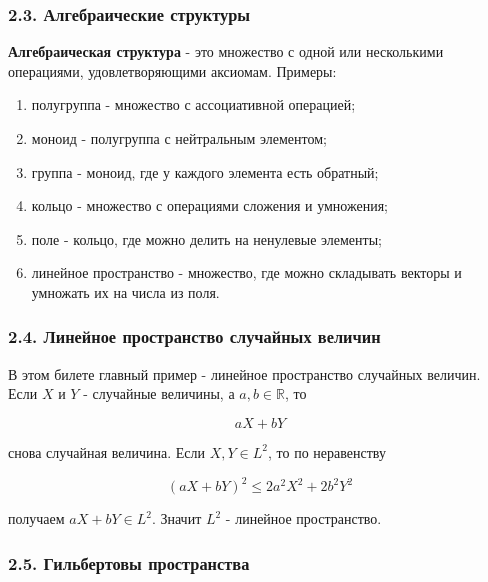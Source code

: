 \documentclass[
  11pt,
  a4paper,
]{article}
\providecommand{\tightlist}{%
  \setlength{\itemsep}{0pt}\setlength{\parskip}{0pt}}
\begin{document}
\subsubsection{2.3. Алгебраические
структуры}\label{ux430ux43bux433ux435ux431ux440ux430ux438ux447ux435ux441ux43aux438ux435-ux441ux442ux440ux443ux43aux442ux443ux440ux44b}

\textbf{Алгебраическая структура} - это множество с одной или
несколькими операциями, удовлетворяющими аксиомам. Примеры:

\begin{enumerate}
\def\labelenumi{\arabic{enumi}.}
\tightlist
\item
  полугруппа - множество с ассоциативной операцией;
\item
  моноид - полугруппа с нейтральным элементом;
\item
  группа - моноид, где у каждого элемента есть обратный;
\item
  кольцо - множество с операциями сложения и умножения;
\item
  поле - кольцо, где можно делить на ненулевые элементы;
\item
  линейное пространство - множество, где можно складывать векторы и
  умножать их на числа из поля.
\end{enumerate}

\subsubsection{2.4. Линейное пространство случайных
величин}\label{ux43bux438ux43dux435ux439ux43dux43eux435-ux43fux440ux43eux441ux442ux440ux430ux43dux441ux442ux432ux43e-ux441ux43bux443ux447ux430ux439ux43dux44bux445-ux432ux435ux43bux438ux447ux438ux43d}

В этом билете главный пример - линейное пространство случайных величин.
Если \(X\) и \(Y\) - случайные величины, а \(a,b\in\mathbb R\), то

\[
aX+bY
\]

снова случайная величина. Если \(X,Y\in L^2\), то по неравенству

\[
(aX+bY)^2\le 2a^2X^2+2b^2Y^2
\]

получаем \(aX+bY\in L^2\). Значит \(L^2\) - линейное пространство.

\subsubsection{2.5. Гильбертовы
пространства}\label{ux433ux438ux43bux44cux431ux435ux440ux442ux43eux432ux44b-ux43fux440ux43eux441ux442ux440ux430ux43dux441ux442ux432ux430}
\end{document}
